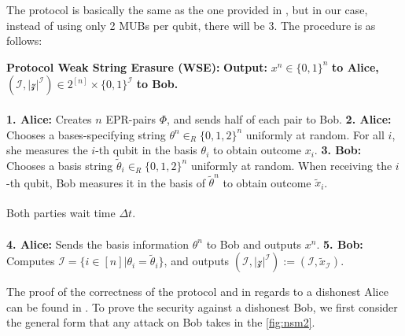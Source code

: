 \begin{definition}
The protocol is basically the same as the one provided in \cite{Konig_2012}, but in our case, instead of using only 2 MUBs per qubit, there will be 3. The procedure is as follows: 
\begin{tcolorbox}
\textbf{Protocol Weak String Erasure (WSE):} 
\newline
\textbf{Output: }$x^n \in \{0,1\}^n$ \textbf{to Alice,} $(\mathcal{I, |z|^{\mathcal{I}}}) \in 2^{[n]} \times \{0,1\}^{\mathcal{I}}$ \textbf{to Bob.}
\\ \hspace*{\fill} \\
\hspace*{0.5cm} \textbf{1. Alice:} Creates $n$ EPR-pairs $\Phi$, and sends half of each pair to Bob.
\newline
\hspace*{0.5cm} \textbf{2. Alice:} Chooses a bases-specifying string $\theta^n \in_R \{0,1,2\}^n$ uniformly at random. 
\newline
\hspace*{1cm} For all $i$, she measures the $i$-th qubit in the basis $\theta_i$ to obtain outcome $x_i$.
\newline
\hspace*{0.5cm} \textbf{3. Bob: } Chooses a basis string $\tilde{\theta}_i \in_R \{0,1,2\}^n$ uniformly at random. When 
\newline
\hspace*{1cm} receiving the $i$-th qubit, Bob measures it in the basis of $\tilde{\theta}^n$ to obtain outcome $\tilde{x}_i$.
\\ \hspace*{\fill} \\
Both parties wait time $\Delta t$. 
\\ \hspace*{\fill} \\
\hspace*{0.5cm} \textbf{4. Alice: } Sends the basis information $\theta^n$ to Bob and outputs $x^n$.
\newline
\hspace*{0.5cm} \textbf{5. Bob: } Computes $\mathcal{I} = \{i \in [n] | \theta_i = \tilde{\theta}_i\}$, and outputs $(\mathcal{I, |z|^{\mathcal{I}}}) := (\mathcal{I}, \tilde{x}_{\mathcal{I}})$.
\end{tcolorbox}

The proof of the correctness of the protocol and in regards to a dishonest Alice can be found in \cite{Konig_2012}. To prove the security against a dishonest Bob, we first consider the general form that any attack on Bob takes in the \autoref{fig:nsm2}.


\end{definition}
